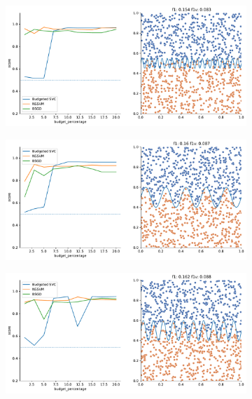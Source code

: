 \begin{figure}
\begin{subfigure}{.5\textwidth}
    \end{subfigure}
    \begin{subfigure}{.5\textwidth}
        \centering
        \includegraphics[width=\textwidth]{img/comp_new/8.pdf}
    \end{subfigure}%
    \hfill
    \begin{subfigure}{.5\textwidth}
        \centering
        \includegraphics[width=\textwidth]{img/comp_new/12.pdf}
    \end{subfigure}
    \begin{subfigure}{.5\textwidth}
        \centering
        \includegraphics[width=\textwidth]{img/comp_new/13.pdf}

\end{subfigure}
\end{figure}

